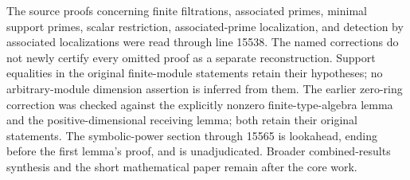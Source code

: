 The source proofs concerning finite filtrations, associated primes, minimal support primes, scalar restriction, associated-prime localization, and detection by associated localizations were read through line 15538. The named corrections do not newly certify every omitted proof as a separate reconstruction. Support equalities in the original finite-module statements retain their hypotheses; no arbitrary-module dimension assertion is inferred from them. The earlier zero-ring correction was checked against the explicitly nonzero finite-type-algebra lemma and the positive-dimensional receiving lemma; both retain their original statements. The symbolic-power section through 15565 is lookahead, ending before the first lemma's proof, and is unadjudicated. Broader combined-results synthesis and the short mathematical paper remain after the core work.
